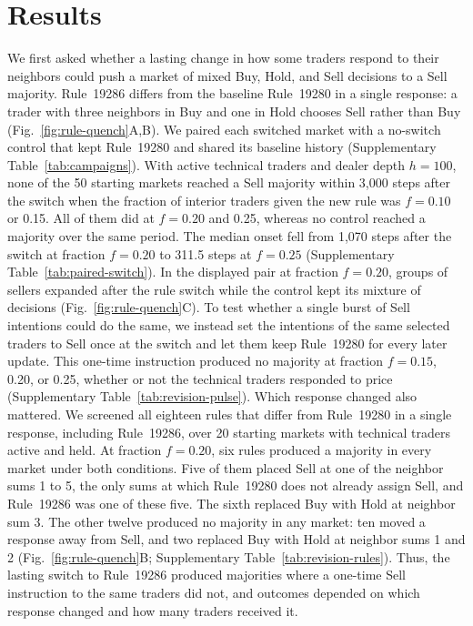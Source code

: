 \section{Results}

We first asked whether a lasting change in how some traders respond to
their neighbors could push a market of mixed Buy, Hold, and Sell
decisions to a Sell majority.
Rule~19286 differs from the baseline Rule~19280 in a single response:
a trader with three neighbors in Buy and one in Hold chooses Sell rather
than Buy (Fig.~\ref{fig:rule-quench}A,B). We paired each switched market
with a no-switch control that kept Rule~19280 and shared its baseline
history (Supplementary
Table~\ref{tab:campaigns}). With active technical traders and dealer
depth $h=100$, none of the 50 starting markets reached a Sell majority
within 3,000 steps after the switch when the fraction of interior
traders given the new rule was $f=0.10$ or 0.15. All of them did at
$f=0.20$ and 0.25, whereas no control reached a majority over the same
period. The median onset fell from 1,070 steps after the switch at
fraction $f=0.20$ to 311.5 steps at $f=0.25$
(Supplementary Table~\ref{tab:paired-switch}). In the displayed pair at
fraction $f=0.20$, groups of sellers expanded after the rule switch
while the control kept its mixture of decisions
(Fig.~\ref{fig:rule-quench}C). To test whether a single burst of Sell
intentions could do the same, we instead set the intentions of the same
selected traders to Sell once at the switch and let them keep
Rule~19280 for every later update. This one-time
instruction produced no majority at fraction $f=0.15$, 0.20, or 0.25,
whether or not the technical traders responded to price
(Supplementary Table~\ref{tab:revision-pulse}). Which response changed
also mattered. We screened all eighteen rules that differ from
Rule~19280 in a single response, including Rule~19286, over 20 starting
markets with technical traders active and held. At fraction $f=0.20$,
six rules produced a majority in every market under both conditions.
Five of them placed Sell at one of the neighbor sums 1 to 5, the only sums
at which Rule~19280 does not already assign Sell, and Rule~19286 was one
of these five. The sixth replaced Buy with Hold at neighbor sum 3. The other twelve produced no majority in any market: ten moved a response away from Sell, and two replaced Buy with Hold at
neighbor sums 1 and 2 (Fig.~\ref{fig:rule-quench}B;
Supplementary Table~\ref{tab:revision-rules}). Thus, the lasting
switch to Rule~19286 produced majorities where a one-time Sell
instruction to the same traders did not, and outcomes depended on which
response changed and how many traders received it.

